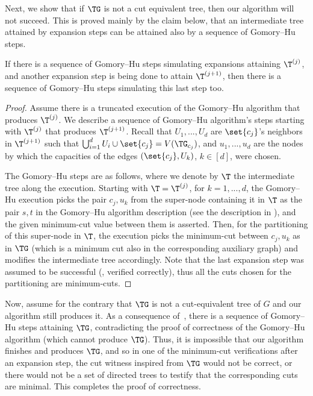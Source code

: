 Next, we show that if $\TG$ is not a cut equivalent tree, then our algorithm will not succeed.
This is proved mainly by the claim below,
that an intermediate tree attained by expansion steps can be attained also by a sequence of Gomory--Hu steps.

\begin{claim}\label{claim:GH}
If there is a sequence of Gomory--Hu steps simulating  expansions attaining ${\T}^{(j)}$, and another expansion step is being done to attain ${\T}^{(j+1)}$, then there is a sequence of Gomory--Hu steps simulating this last step too.
\end{claim}

\begin{proof}
Assume there is a truncated execution of the Gomory--Hu algorithm that produces ${\T}^{(j)}$. We describe a sequence of Gomory--Hu algorithm's steps starting with ${\T}^{(j)}$ that produces ${\T}^{(j+1)}$.
Recall that $U_{1},...,U_{d}$ are $\set{c_j}$'s neighbors in $\T^{(j+1)}$ such that $\bigcup_{i=1}^d U_i\cup \set{c_j} = V(\TG_{c_j})$,
and $u_{1},...,u_{d}$ are the nodes by which the capacities of the edges $(\set{c_j},U_k)$, $k\in [d]$, were chosen.

The Gomory--Hu steps are as follows, where we denote by $\T$ the intermediate tree along the execution.
Starting with $\T=\T^{(j)}$, for $k=1,...,d$, the Gomory--Hu execution picks the pair $c_j,u_{k}$ from the super-node containing it in $\T$ as the pair $s,t$ in the Gomory--Hu algorithm description (see the description in ), and the given minimum-cut value between them is asserted. Then, for the partitioning of this super-node in $\T$, the execution picks the minimum-cut between $c_j,u_{k}$ as in $\TG$ (which is a minimum cut also in the corresponding auxiliary graph) and modifies the intermediate tree accordingly. Note that the last expansion step was assumed to be successful (\ie, verified correctly), thus all the cuts chosen for the partitioning are minimum-cuts.
\end{proof}

Now, assume for the contrary that $\TG$ is not a cut-equivalent tree of $G$ and our algorithm still produces it.
As a consequence of~, there is a sequence of Gomory--Hu steps attaining $\TG$, contradicting the proof of correctness of the Gomory--Hu algorithm (which cannot produce $\TG$).
Thus, it is impossible that our algorithm finishes and produces $\TG$, and so in one of the minimum-cut verifications after an expansion step, the cut witness inspired from $\TG$ would not be correct, or there would not be a set of directed trees to testify that the corresponding cuts are minimal. This completes the proof of correctness.

